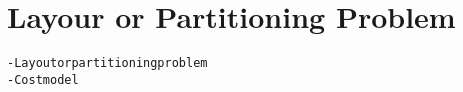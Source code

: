 \section{Layour or Partitioning Problem}\label{sec:problem}

\begin{alltt}\scriptsize
- Layout or partitioning problem
    - Cost model
\end{alltt}

